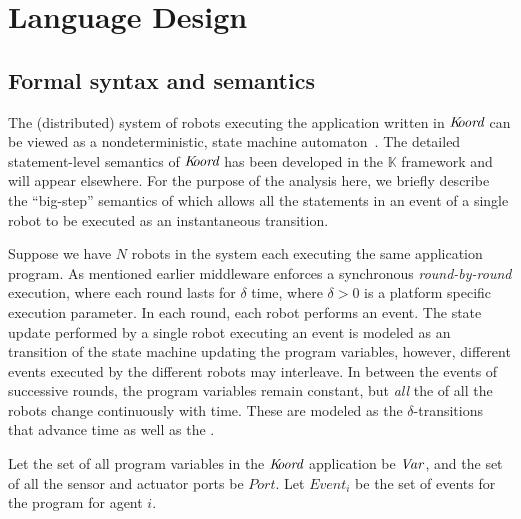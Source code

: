 \section{\lgname Language Design}
\label{sec:language}


\subsection{Formal syntax and semantics}
\label{sec:semantics}
The (distributed) system of robots  executing the \dmap application written in $\emph{K\kern-2pt oord}$ can be viewed as a nondeterministic, state machine automaton~\cite{TIOAmon, Mitra07PhD}. The detailed statement-level semantics of $\emph{K\kern-2pt oord}$ has been developed in the $\mathbb{K}$ framework and will appear elsewhere. For the purpose of the analysis here, we briefly describe the ``big-step'' semantics of \lgname which allows all the statements in an event of a single robot to be executed as an instantaneous transition.

Suppose we have $N$ robots in the system each executing the same \lgname application program. As mentioned earlier \lgname middleware enforces a synchronous \emph{round-by-round} execution, where each round lasts for $\delta$ time, where $\delta >0$ is a platform specific execution parameter.
%
In each round, each robot performs an  event.
The state update performed by a single robot executing an  event is modeled as an  transition of the state machine updating the program variables, however,  different events executed by the different robots may interleave. In between the events of successive rounds, the program variables remain constant, but {\em all\/} the  of all the robots  change continuously with time.  These are modeled as the $\delta$-transitions that advance time as well as the .

%
Let the set of all program variables in the $\emph{K\kern-2pt oord}$ application be $\mathit{Var}$, and the set of all the sensor and actuator ports be $\mathit{Port}$. Let $\mathit{Event}_i$ be the set of events for the program for agent $i$.


